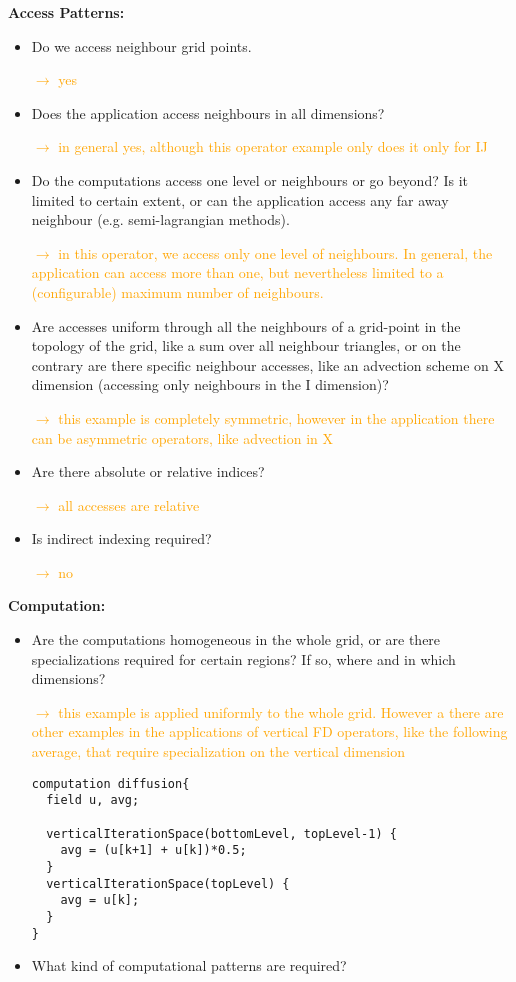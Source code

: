 \documentclass[a4paper,10pt]{scrartcl}
\begin{document}
\textbf{Access Patterns:}\newline
\begin{itemize} 
	\item Do we access neighbour grid points.
	
	\textcolor{orange}{$\rightarrow$ yes}
	
	\item Does the application access neighbours in all dimensions? 
	
	\textcolor{orange}{$\rightarrow$ in general yes, although this operator example only does it only for IJ}
	\item Do the computations access one level or neighbours or go beyond? Is it limited to certain extent, or can the application access any far away neighbour (e.g. semi-lagrangian methods).
	
	\textcolor{orange}{$\rightarrow$ in this operator, we access only one level of neighbours. In general, the application can access more than one, but nevertheless limited to a (configurable) maximum number of neighbours.}
	
	\item Are accesses uniform through all the neighbours of a grid-point in the topology of the grid, like a sum over all neighbour
	triangles, or on the contrary are there specific neighbour accesses, like an advection scheme on X dimension (accessing  only neighbours in the I dimension)?
	
	\textcolor{orange}{$\rightarrow$ this example is completely symmetric, however in the application there can be asymmetric operators, like advection in X}
	
	\item Are there absolute or relative indices?
	
	\textcolor{orange}{$\rightarrow$ all accesses are relative}
	\item Is indirect indexing required?
	
	\textcolor{orange}{$\rightarrow$ no}
\end{itemize}

\textbf{Computation:}\newline
\begin{itemize}
	\item Are the computations homogeneous in the whole grid, or are there specializations required for certain regions? If so, where and in which dimensions?
	
	\textcolor{orange}{$\rightarrow$ this example is applied uniformly to the whole grid. However a there are other examples in the applications of vertical FD operators, like the following average, that require specialization on the vertical dimension}
	
	\begin{lstlisting}
computation diffusion{
  field u, avg;
  
  verticalIterationSpace(bottomLevel, topLevel-1) {
    avg = (u[k+1] + u[k])*0.5;
  }
  verticalIterationSpace(topLevel) {
    avg = u[k];
  }
}
	\end{lstlisting}
	
	\item What kind of computational patterns are required? 
\end{itemize}
\end{document}
